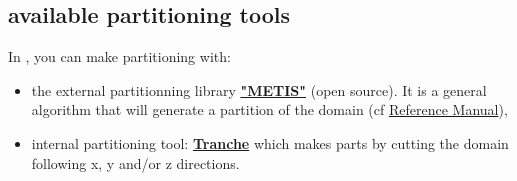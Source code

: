 \subsection{\trust available partitioning tools} \label{partitioner}
In \trust, you can make partitioning with:
\begin{itemize}
\item the external partitionning library \href{http://glaros.dtc.umn.edu/gkhome/views/metis}{\textbf{"METIS"}} (open source). It is a general algorithm that will generate a partition of the domain (cf \href{\REFERENCEMANUAL\#partitionneurmetis}{\trustref Reference Manual}),
\begin{center}
\end{center}

\item internal \trust partitioning tool: \href{\REFERENCEMANUAL\#partitionneurtranche}{\textbf{Tranche}} which makes parts by cutting the domain following x, y and/or z directions.
    \begin{center}
    \end{center}



\end{itemize}
